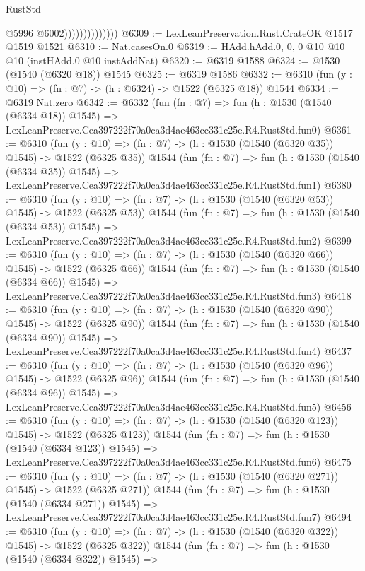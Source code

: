 \begin{lexlean}{RustStd}
\begin{coremodule}
                                @5996
                                @6002))))))))))))))
@6309 := LexLeanPreservation.Rust.CrateOK @1517 @1519 @1521
@6310 := Nat.casesOn.{0}
@6319 := HAdd.hAdd.{0, 0, 0} @10 @10 @10 (instHAdd.{0} @10 instAddNat)
@6320 := @6319 @1588
@6324 := @1530 (@1540 (@6320 @18)) @1545
@6325 := @6319 @1586
@6332 := @6310 (fun (y : @10) => (fn : @7) -> (h : @6324) -> @1522 (@6325 @18)) @1544
@6334 := @6319 Nat.zero
@6342 := @6332
    (fun (fn : @7) =>
    fun (h : @1530 (@1540 (@6334 @18)) @1545) =>
    LexLeanPreserve.Cea397222f70a0ca3d4ae463cc331c25e.R4.RustStd.fun0)
@6361 := @6310
    (fun (y : @10) => (fn : @7) -> (h : @1530 (@1540 (@6320 @35)) @1545) -> @1522 (@6325 @35))
    @1544
    (fun (fn : @7) =>
    fun (h : @1530 (@1540 (@6334 @35)) @1545) =>
    LexLeanPreserve.Cea397222f70a0ca3d4ae463cc331c25e.R4.RustStd.fun1)
@6380 := @6310
    (fun (y : @10) => (fn : @7) -> (h : @1530 (@1540 (@6320 @53)) @1545) -> @1522 (@6325 @53))
    @1544
    (fun (fn : @7) =>
    fun (h : @1530 (@1540 (@6334 @53)) @1545) =>
    LexLeanPreserve.Cea397222f70a0ca3d4ae463cc331c25e.R4.RustStd.fun2)
@6399 := @6310
    (fun (y : @10) => (fn : @7) -> (h : @1530 (@1540 (@6320 @66)) @1545) -> @1522 (@6325 @66))
    @1544
    (fun (fn : @7) =>
    fun (h : @1530 (@1540 (@6334 @66)) @1545) =>
    LexLeanPreserve.Cea397222f70a0ca3d4ae463cc331c25e.R4.RustStd.fun3)
@6418 := @6310
    (fun (y : @10) => (fn : @7) -> (h : @1530 (@1540 (@6320 @90)) @1545) -> @1522 (@6325 @90))
    @1544
    (fun (fn : @7) =>
    fun (h : @1530 (@1540 (@6334 @90)) @1545) =>
    LexLeanPreserve.Cea397222f70a0ca3d4ae463cc331c25e.R4.RustStd.fun4)
@6437 := @6310
    (fun (y : @10) => (fn : @7) -> (h : @1530 (@1540 (@6320 @96)) @1545) -> @1522 (@6325 @96))
    @1544
    (fun (fn : @7) =>
    fun (h : @1530 (@1540 (@6334 @96)) @1545) =>
    LexLeanPreserve.Cea397222f70a0ca3d4ae463cc331c25e.R4.RustStd.fun5)
@6456 := @6310
    (fun (y : @10) => (fn : @7) -> (h : @1530 (@1540 (@6320 @123)) @1545) -> @1522 (@6325 @123))
    @1544
    (fun (fn : @7) =>
    fun (h : @1530 (@1540 (@6334 @123)) @1545) =>
    LexLeanPreserve.Cea397222f70a0ca3d4ae463cc331c25e.R4.RustStd.fun6)
@6475 := @6310
    (fun (y : @10) => (fn : @7) -> (h : @1530 (@1540 (@6320 @271)) @1545) -> @1522 (@6325 @271))
    @1544
    (fun (fn : @7) =>
    fun (h : @1530 (@1540 (@6334 @271)) @1545) =>
    LexLeanPreserve.Cea397222f70a0ca3d4ae463cc331c25e.R4.RustStd.fun7)
@6494 := @6310
    (fun (y : @10) => (fn : @7) -> (h : @1530 (@1540 (@6320 @322)) @1545) -> @1522 (@6325 @322))
    @1544
    (fun (fn : @7) =>
    fun (h : @1530 (@1540 (@6334 @322)) @1545) =>

\end{coremodule}
\end{lexlean}
